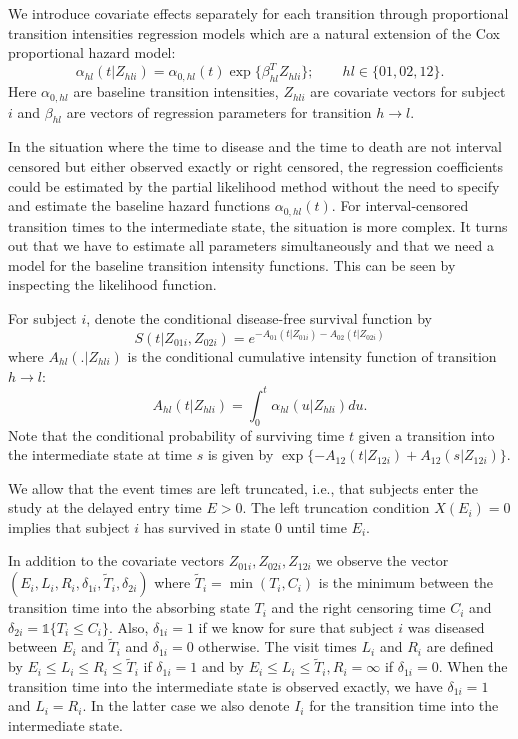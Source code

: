 \documentclass[article]{jss}
\begin{document}
We introduce covariate effects separately for each transition through
proportional transition intensities regression models which are a
natural extension of the Cox proportional hazard model:
\begin{equation}
\alpha_{hl}(t|Z_{hli})=\alpha_{0,hl}(t)\exp\{\beta_{hl}^T Z_{hli}\};\qquad hl \in \{01,02,12\}.
\end{equation}
Here \(\alpha_{0,hl}\) are baseline transition intensities, \(Z_{hli}\)
are covariate vectors for subject \(i\) and \(\beta_{hl}\) are vectors of
regression parameters for transition \(h \rightarrow l\).

In the situation where the time to disease and the time to death are
not interval censored but either observed exactly or right censored,
the regression coefficients could be estimated by the partial likelihood
method without the need to specify and estimate the baseline hazard
functions \(\alpha_{0,hl}(t)\). For interval-censored transition times
to the intermediate state, the situation is more complex. It turns out
that we have to estimate all parameters simultaneously and that we
need a model for the baseline transition intensity functions. This can
be seen by inspecting the likelihood function.

For subject \(i\), denote the conditional disease-free survival function
by 
\begin{equation*}
S(t|Z_{01i},Z_{02i})=e^{- A_{01}(t|Z_{01i}) -A_{02}(t|Z_{02i})}
\end{equation*}
where \({A}_{hl}(.|Z_{hli})\) is the conditional cumulative intensity
function of transition \(h \rightarrow l\):
\begin{equation*}
{A}_{hl}(t|Z_{hli})=\int_0^t {\alpha}_{hl}(u|Z_{hli})du.
\end{equation*}
Note that
the conditional probability of surviving time \(t\) given a transition
into the intermediate state at time \(s\) is given by
$\exp\{-{A}_{12}(t|Z_{12i})+{A}_{12}(s|Z_{12i})\}.$

We allow that the event times are left truncated, i.e., that subjects
enter the study at the delayed entry time \(E>0\). The left truncation
condition \(X(E_{i})=0\) implies that subject \(i\) has survived in state
0 until time \(E_{i}\).

In addition to the covariate vectors \(Z_{01i},Z_{02i},Z_{12i}\) we
observe the vector \((E_i,L_i,R_i,\delta_{1i},\tilde T_i,\delta_{2i})\)
where \(\tilde T_i=\min(T_i,C_i)\) is the minimum between the transition
time into the absorbing state \(T_i\) and the right censoring time \(C_i\)
and \(\delta_{2i}=\mathds{1}\{T_i\le C_i\}\). Also, \(\delta_{1i}=1\) if we know
for sure that subject \(i\) was diseased between \(E_i\) and \(\tilde T_i\)
and \(\delta_{1i}=0\) otherwise. The visit times \(L_i\) and \(R_i\) are
defined by \(E_i\le L_i\le R_i\le \tilde T_i\) if \(\delta_{1i}=1\) and by
\(E_i\le L_i \le \tilde T_i, R_i=\infty\) if \(\delta_{1i}=0\). When the
transition time into the intermediate state is observed exactly, we
have \(\delta_{1i}=1\) and \(L_i=R_i\). In the latter case we also denote
\(I_i\) for the transition time into the intermediate state.
\end{document}
